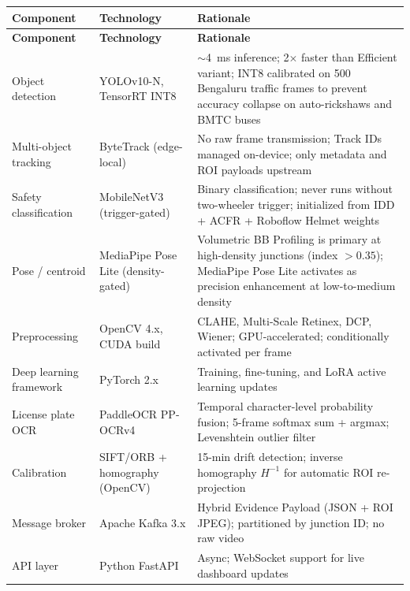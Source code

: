 \documentclass[11pt,a4paper]{article}
\begin{document}
\begin{longtable}{L{3.5cm} L{4.5cm} L{6.5cm}}
    \toprule
    \color{white}\textbf{Component} & \color{white}\textbf{Technology} & \color{white}\textbf{Rationale} \\
    \midrule
    \endfirsthead
    \toprule
    \color{white}\textbf{Component} & \color{white}\textbf{Technology} & \color{white}\textbf{Rationale} \\
    \midrule
    \endhead
    \bottomrule
    \endfoot

    Object detection & YOLOv10-N, TensorRT INT8 & $\sim$4~ms inference; 2$\times$ faster than Efficient variant; INT8 calibrated on 500 Bengaluru traffic frames to prevent accuracy collapse on auto-rickshaws and BMTC buses \\
    Multi-object tracking & ByteTrack (edge-local) & No raw frame transmission; Track IDs managed on-device; only metadata and ROI payloads upstream \\
    Safety classification & MobileNetV3 (trigger-gated) & Binary classification; never runs without two-wheeler trigger; initialized from IDD + ACFR + Roboflow Helmet weights \\
    Pose / centroid & MediaPipe Pose Lite (density-gated) & Volumetric BB Profiling is primary at high-density junctions (index $> 0.35$); MediaPipe Pose Lite activates as precision enhancement at low-to-medium density \\
    Preprocessing & OpenCV 4.x, CUDA build & CLAHE, Multi-Scale Retinex, DCP, Wiener; GPU-accelerated; conditionally activated per frame \\
    Deep learning framework & PyTorch 2.x & Training, fine-tuning, and LoRA active learning updates \\
    License plate OCR & PaddleOCR PP-OCRv4 & Temporal character-level probability fusion; 5-frame softmax sum + argmax; Levenshtein outlier filter \\
    Calibration & SIFT/ORB + homography (OpenCV) & 15-min drift detection; inverse homography $H^{-1}$ for automatic ROI re-projection \\
    Message broker & Apache Kafka 3.x & Hybrid Evidence Payload (JSON + ROI JPEG); partitioned by junction ID; no raw video \\
    API layer & Python FastAPI & Async; WebSocket support for live dashboard updates \\

\end{longtable}
\end{document}
